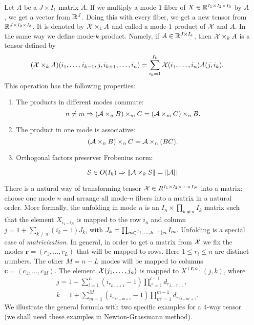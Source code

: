 Let $A$ be a $J \times I_1$ matrix $A$. If we multiply a mode-$1$ fiber of $X \in \mathbb{R}^{I_1 \times I_2 \times I_3}$ by $A$,
we get a vector from $\mathbb{R}^J$. Doing this with every fiber, we get a new tensor from $\mathbb{R}^{J \times I_2 \times I_3}$. It is denoted by 
$\mathcal{X} \times _{1} A$ and called a mode-$1$ product of $\mathcal{X}$ and $A$. In the same way we define mode-$k$ product. Namely,
if $A \in \mathbb{R}^{J \times I_k}$, then $\mathcal{X} \times_k A$ is a tensor defined by
\begin{equation}
    (\mathcal{X} \times_k A)(i_1, \dots, i_{k-1}, j, i_{k+1}, \dots, i_n) = \sum_{i_k = 1}^{I_k} \mathcal{X}(i_1, \dots, i_n) A(j, i_k).
\end{equation}
This operation has the following properties:
\begin{enumerate}
\item The products in different modes commute:
\begin{equation}
n \not= m \Rightarrow (\mathcal{A} \times _n B) \times_m C = (\mathcal{A} \times _m C) \times_n B.
\end{equation}
\item The product in one mode is associative:
\begin{equation}
(\mathcal{A} \times_n B) \times_n C = \mathcal{A} \times_n (BC).
\end{equation}
\item Orthogonal factors preserver Frobenius norm:

\begin{equation}
\label{orthogonal_norm_inv}
S \in O(I_k)  \Rightarrow \| \mathcal{A} \times_k S \| = \| \mathcal{A} \|.
\end{equation}
\end{enumerate}

There is a natural way of transforming tensor $\mathcal{X} \in R^{I_1 \times I_2 \times \cdots \times I_N}$ into a matrix: choose one mode $n$
and arrange all mode-$n$ fibers into a matrix in a natural order. More formally,
the unfolding in mode $n$ is an $I_n \times \prod_{k \neq n} I_k$ matrix such that
the element $X_{i_1 \dots i_N}$ is mapped to the row $i_n$ and column $j = 1 + \sum_{ k \neq n} (i_k - 1) J_k$,
with $J_k = \prod_{ m \in \{ 1, \dots, k-1 \} \\ {n} } I_m$.
 Unfolding  is a special case of \textit{matricization}. In general, in order to get a matrix
from $\mathcal{X}$ we fix the modes $\mathbf{r} =  (r_1, \dots, r_L)$ that will be mapped to rows.
Here $1 \leq r_i \leq n$ are distinct numbers. The other $M = n - L$  modes will be mapped
to columns $\mathbf{c} = (c_1, \dots, c_M)$.
The element $\mathcal{X}(j_1, \dots, j_n)$ is mapped to $X^{(\mathbf{r};\mathbf{c})}(j, k)$, where
\begin{eqnarray}
    j = 1 + \sum_{l = 1}^{L} ( i_{r_{L-l+1}} - 1) \prod_{l' = 1}^{l - 1} d_{r_{L - l' + 1}}, \\
    k = 1 + \sum_{m = 1}^{M} ( i_{r_{M-m+1}} - 1) \prod_{m' = 1}^{m - 1} d_{r_{M - m' + 1}}.
\end{eqnarray}
We illustrate the general formula with two specific examples
for a $4$-way tensor (we shall need these examples in Newton-Grassmann method).

